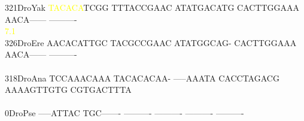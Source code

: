 \documentclass[11pt,twoside,reqno,a4paper]{article}
\begin{document}
{321\hspace*{2\charwidth}DroYak	\textcolor{Yellow}{T}\textcolor{Yellow}{A}\textcolor{Yellow}{C}\textcolor{Yellow}{A}\textcolor{Yellow}{C}\textcolor{Yellow}{A}TCGG	TTTACCGAAC	ATATGACATG	CACTTGGAAA	AACA------	----------	\\
\hspace*{5\charwidth}\hspace*{7\charwidth}\hspace*{0\charwidth}\textcolor{Yellow}{7.1}\hspace*{1\charwidth}\hspace*{1\charwidth}\hspace*{1\charwidth}\hspace*{1\charwidth}\hspace*{1\charwidth}\hspace*{1\charwidth}\\
326\hspace*{2\charwidth}DroEre	AACACATTGC	TACGCCGAAC	ATATGGCAG-	CACTTGGAAA	AACA------	----------	\\
\hspace*{5\charwidth}\hspace*{7\charwidth}\hspace*{1\charwidth}\hspace*{1\charwidth}\hspace*{1\charwidth}\hspace*{1\charwidth}\hspace*{1\charwidth}\hspace*{1\charwidth}\\
318\hspace*{2\charwidth}DroAna	TCCAAACAAA	TACACACAA-	-----AAATA	CACCTAGACG	AAAAGTTGTG	CGTGACTTTA	\\
\hspace*{5\charwidth}\hspace*{7\charwidth}\hspace*{1\charwidth}\hspace*{1\charwidth}\hspace*{1\charwidth}\hspace*{1\charwidth}\hspace*{1\charwidth}\hspace*{1\charwidth}\\
0\hspace*{4\charwidth}DroPse	-----ATTAC	TGC-------	----------	----------	----------	----------	\\
\hspace*{5\charwidth}\hspace*{7\charwidth}\hspace*{1\charwidth}\hspace*{1\charwidth}\hspace*{1\charwidth}\hspace*{1\charwidth}\hspace*{1\charwidth}\hspace*{1\charwidth}\\
}
\end{document}

